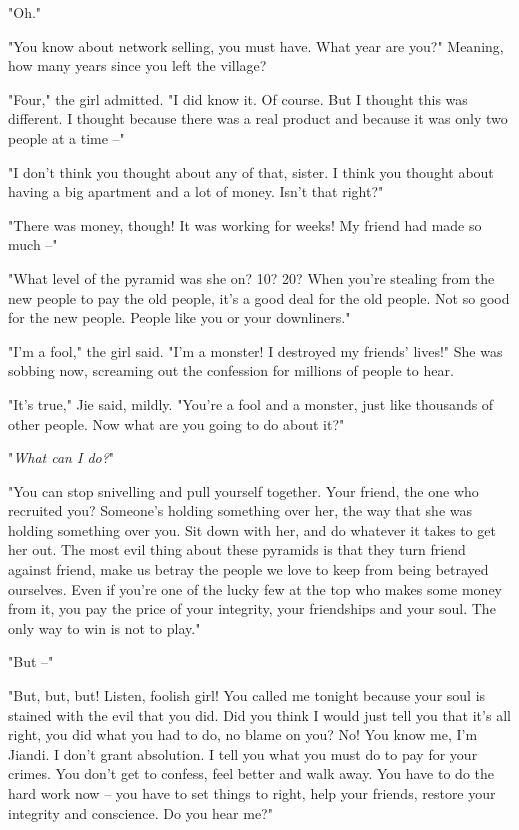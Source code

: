 "Oh."

"You know about network selling, you must have. What year are you?"
Meaning, how many years since you left the village?

"Four," the girl admitted. "I did know it. Of course. But I thought
this was different. I thought because there was a real product and
because it was only two people at a time --"

"I don't think you thought about any of that, sister. I think you
thought about having a big apartment and a lot of money. Isn't that
right?"

"There was money, though! It was working for weeks! My friend had
made so much --"

"What level of the pyramid was she on? 10? 20? When you're stealing
from the new people to pay the old people, it's a good deal for the
old people. Not so good for the new people. People like you or your
downliners."

"I'm a fool," the girl said. "I'm a monster! I destroyed my
friends' lives!" She was sobbing now, screaming out the confession
for millions of people to hear.

"It's true," Jie said, mildly. "You're a fool and a monster, just
like thousands of other people. Now what are you going to do about
it?"

"\emph{What can I do?}"

"You can stop snivelling and pull yourself together. Your friend,
the one who recruited you? Someone's holding something over her,
the way that she was holding something over you. Sit down with her,
and do whatever it takes to get her out. The most evil thing about
these pyramids is that they turn friend against friend, make us
betray the people we love to keep from being betrayed ourselves.
Even if you're one of the lucky few at the top who makes some money
from it, you pay the price of your integrity, your friendships and
your soul. The only way to win is not to play."

"But --"

"But, but, but! Listen, foolish girl! You called me tonight because
your soul is stained with the evil that you did. Did you think I
would just tell you that it's all right, you did what you had to
do, no blame on you? No! You know me, I'm Jiandi. I don't grant
absolution. I tell you what you must do to pay for your crimes. You
don't get to confess, feel better and walk away. You have to do the
hard work now -- you have to set things to right, help your
friends, restore your integrity and conscience. Do you hear me?"

